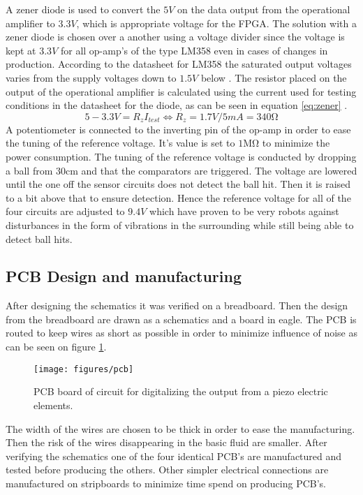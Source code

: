 \begin{equation}
\label{eq:zener5VResistor}
\end{equation}
A zener diode \cite{zener} is used to convert the $5V$ on the data output from the operational amplifier to $3.3V$, which is appropriate voltage for the FPGA. The solution with a zener diode is chosen over a another using a voltage divider since the voltage is kept at $3.3V$ for all op-amp's of the type LM358 even in cases of changes in production. According to the datasheet for LM358 the saturated output voltages varies from the supply voltages down to $1.5V$ below \cite{lm358}.
The resistor placed on the output of the operational amplifier is calculated using the current used for testing conditions in the datasheet for the diode, as can be seen in equation \ref{eq:zener} \cite{zener}.
\begin{equation}
5-3.3V = R_{z} I_{test} \Leftrightarrow R_{z} = 1.7V/5mA = 340\si{\ohm}
\label{eq:zener}
\end{equation}
%
A potentiometer is connected to the inverting pin of the op-amp in order to ease the tuning of the reference voltage. It's value is set to $1\si{\mega\ohm}$ to minimize the power consumption.
The tuning of the reference voltage is conducted by dropping a ball from $30\si{\centi\meter}$  and that the comparators are triggered. The voltage are lowered until the one off the sensor circuits does not detect the ball hit. Then it is raised to a bit above that to ensure detection. Hence the reference voltage for all of the four circuits are adjusted to $9.4V$ which have proven to be very robots against disturbances in the form of vibrations in the surrounding while still being able to detect ball hits.
%
\subsection{PCB Design and manufacturing}
After designing the schematics it was verified on a breadboard. Then the design from the breadboard are drawn as a schematics and a board in eagle.
The PCB is routed to keep wires as short as possible in order to minimize influence of noise as can be seen on figure \ref{fig:pcb}.
\begin{figure}[htb]
	\centering
	\texttt{[image: figures/pcb]}
	\caption{PCB board of circuit for digitalizing the output from a piezo electric elements.}
	\label{fig:pcb}
\end{figure}
The width of the wires are chosen to be thick in order to ease the manufacturing. Then the risk of the wires disappearing in the basic fluid are smaller.
After verifying the schematics one of the four identical PCB's are manufactured and tested before producing the others.
Other simpler electrical connections are manufactured on stripboards to minimize time spend on producing PCB's.